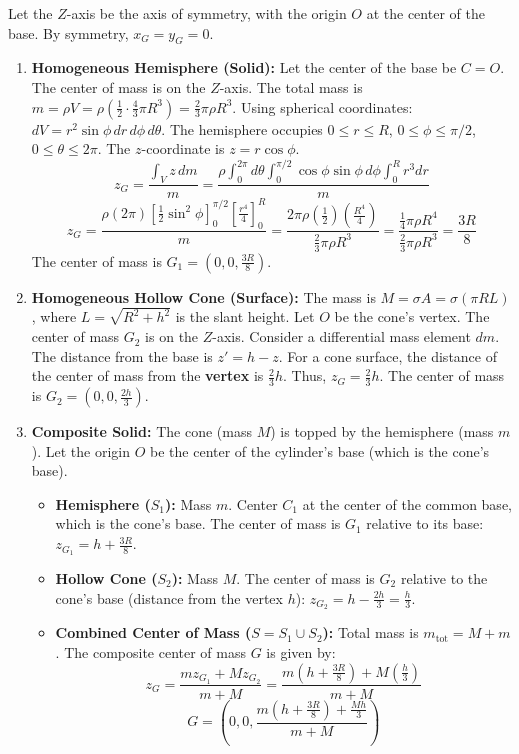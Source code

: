 \documentclass[12pt]{article}
\begin{document}
\begin{correctionbox}
Let the $Z$-axis be the axis of symmetry, with the origin $O$ at the center of the base. By symmetry, $x_G=y_G=0$.

\begin{enumerate}
    \item \textbf{Homogeneous Hemisphere (Solid):}
        Let the center of the base be $C=O$. The center of mass is on the $Z$-axis.
        The total mass is $m = \rho V = \rho \left(\frac{1}{2} \cdot \frac{4}{3}\pi R^3\right) = \frac{2}{3}\pi \rho R^3$.
        Using spherical coordinates: $dV = r^2 \sin\phi \, dr \, d\phi \, d\theta$. The hemisphere occupies $0 \le r \le R$, $0 \le \phi \le \pi/2$, $0 \le \theta \le 2\pi$.
        The $z$-coordinate is $z=r\cos\phi$.
        $$z_G = \frac{\int_V z \, dm}{m} = \frac{\rho \int_0^{2\pi} d\theta \int_0^{\pi/2} \cos\phi \sin\phi \, d\phi \int_0^R r^3 dr}{m}$$
        $$z_G = \frac{\rho (2\pi) \left[\frac{1}{2}\sin^2\phi\right]_0^{\pi/2} \left[\frac{r^4}{4}\right]_0^R}{m} = \frac{2\pi\rho \left(\frac{1}{2}\right) \left(\frac{R^4}{4}\right)}{\frac{2}{3}\pi \rho R^3} = \frac{\frac{1}{4}\pi\rho R^4}{\frac{2}{3}\pi \rho R^3} = \frac{3R}{8}$$
        The center of mass is $G_1 = \left(0, 0, \frac{3R}{8}\right)$.
    \item \textbf{Homogeneous Hollow Cone (Surface):}
        The mass is $M = \sigma A = \sigma (\pi R L)$, where $L=\sqrt{R^2+h^2}$ is the slant height. Let $O$ be the cone's vertex. The center of mass $G_2$ is on the $Z$-axis.
        Consider a differential mass element $dm$. The distance from the base is $z' = h-z$. For a cone surface, the distance of the center of mass from the \textbf{vertex} is $\frac{2}{3}h$.
        Thus, $z_G = \frac{2}{3}h$.
        The center of mass is $G_2 = \left(0, 0, \frac{2h}{3}\right)$.
    \item \textbf{Composite Solid:}
        The cone (mass $M$) is topped by the hemisphere (mass $m$). Let the origin $O$ be the center of the cylinder's base (which is the cone's base).
        \begin{itemize}
            \item \textbf{Hemisphere ($S_1$):} Mass $m$. Center $C_1$ at the center of the common base, which is the cone's base. The center of mass is $G_1$ relative to its base: $z_{G_1} = h + \frac{3R}{8}$.
            \item \textbf{Hollow Cone ($S_2$):} Mass $M$. The center of mass is $G_2$ relative to the cone's base (distance from the vertex $h$): $z_{G_2} = h - \frac{2h}{3} = \frac{h}{3}$.
            \item \textbf{Combined Center of Mass ($S=S_1 \cup S_2$):} Total mass is $m_{\text{tot}}=M+m$.
            The composite center of mass $G$ is given by:
            $$z_G = \frac{m z_{G_1} + M z_{G_2}}{m+M} = \frac{m\left(h+\frac{3R}{8}\right) + M\left(\frac{h}{3}\right)}{m+M}$$
            $$G = \left(0, 0, \frac{m\left(h+\frac{3R}{8}\right) + \frac{Mh}{3}}{m+M}\right)$$
    \end{itemize}
\end{enumerate}

\end{correctionbox}
\end{document}

